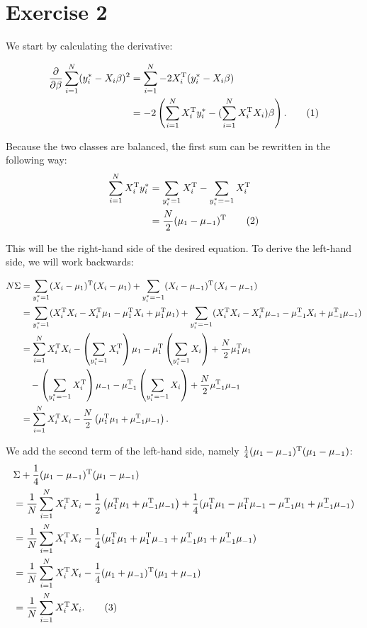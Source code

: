 \documentclass{article}
\newcommand{\T}{{\rm T}}
\begin{document}
\section*{Exercise 2}

We start by calculating the derivative:

\begin{align*}
\frac{\partial}{\partial \beta} \sum_{i=1}^N (y_i^* - X_i \beta)^2 &= \sum_{i=1}^N -2X_i^\T (y_i^* - X_i \beta)\\
&= -2 \left(\sum_{i=1}^N X_i^\T y_i^* - (\sum_{i=1}^N X_i^\T X_i)\beta\right).\tag{1}
\end{align*}

Because the two classes are balanced, the first sum can be rewritten in the following way:
\begin{align*}
\sum_{i=1}^N X_i^\T y_i^* &= \sum_{y_i^* = 1} X_i^\T - \sum_{y_i^*= -1} X_i^\T\\
&= \frac{N}{2} (\mu_1 - \mu_{-1})^\T\tag{2}
\end{align*}

This will be the right-hand side of the desired equation. To derive the left-hand side, we will work backwards:

\begin{align*}
N \Sigma &= \sum_{y_i^* = 1} (X_i - \mu_1)^\T (X_i - \mu_1) + \sum_{y_i^* = -1} (X_i - \mu_{-1})^\T (X_i - \mu_{-1})\\
&= \sum_{y_i^* = 1} (X_i^\T X_i - X_i^\T \mu_1 - \mu_1^\T X_i + \mu_1^\T \mu_1) + \sum_{y_i^* = -1} (X_i^\T X_i - X_i^\T \mu_{-1} - \mu_{-1}^\T X_i + \mu_{-1}^\T \mu_{-1})\\
&= \sum_{i=1}^N X_i^\T X_i - \left(\sum_{y_i^* = 1} X_i^\T\right) \mu_1 - \mu_1^\T \left(\sum_{y_i^* = 1} X_i\right) + \frac{N}{2} \mu_1^\T \mu_1\\
&\hspace{1em} - \left(\sum_{y_i^* = -1} X_i^\T\right) \mu_{-1} - \mu_{-1}^\T \left(\sum_{y_i^* = -1} X_i\right) + \frac{N}{2} \mu_{-1}^\T \mu_{-1}\\
&= \sum_{i=1}^N X_i^\T X_i - \frac{N}{2} \left(\mu_1^\T \mu_1 + \mu_{-1}^\T \mu_{-1}\right).
\end{align*}

We add the second term of the left-hand side, namely $\frac{1}{4}(\mu_1 - \mu_{-1})^\T (\mu_1 - \mu_{-1})$:
\begin{align*}
&\Sigma + \frac{1}{4}(\mu_1 - \mu_{-1})^\T (\mu_1 - \mu_{-1})\\
&= \frac{1}{N} \sum_{i=1}^N X_i^\T X_i - \frac{1}{2} \left(\mu_1^\T \mu_1 + \mu_{-1}^\T \mu_{-1}\right) + \frac{1}{4}(\mu_1^\T \mu_1 - \mu_1^\T \mu_{-1} - \mu_{-1}^\T \mu_1 + \mu_{-1}^\T \mu_{-1})\\
&= \frac{1}{N} \sum_{i=1}^N X_i^\T X_i - \frac{1}{4}(\mu_1^\T \mu_1 + \mu_1^\T \mu_{-1} + \mu_{-1}^\T \mu_1 + \mu_{-1}^\T \mu_{-1})\\
&= \frac{1}{N} \sum_{i=1}^N X_i^\T X_i - \frac{1}{4}(\mu_1 + \mu_{-1})^\T (\mu_1 + \mu_{-1})\\
&= \frac{1}{N} \sum_{i=1}^N X_i^\T X_i.\tag{3}
\end{align*}
\end{document}
